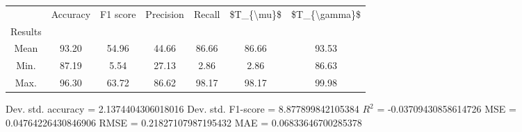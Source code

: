 \begin{tabular}{|c|c|c|c|c|c|c|}
\toprule
{} &  Accuracy &  F1 score &  Precision &  Recall &  \$T\_\{\textbackslash mu\}\$ &  \$T\_\{\textbackslash gamma\}\$ \\
Results &           &           &            &         &            &               \\
\hline
Mean    &     93.20 &     54.96 &      44.66 &   86.66 &      86.66 &         93.53 \\
Min.    &     87.19 &      5.54 &      27.13 &    2.86 &       2.86 &         86.63 \\
Max.    &     96.30 &     63.72 &      86.62 &   98.17 &      98.17 &         99.98 \\
\bottomrule
\end{tabular}

 Dev. std. accuracy = 2.1374404306018016
 Dev. std. F1-score = 8.877899842105384
 $R^2$ = -0.03709430858614726
 MSE = 0.04764226430846906
 RMSE = 0.21827107987195432
 MAE = 0.06833646700285378